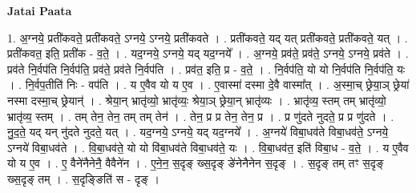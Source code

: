 \documentclass[17pt]{extarticle}
\begin{document}
\textbf{Jatai Paata} \newline

1. अ॒ग्नये॒ प्रती॑कवते॒ प्रती॑कवते॒ ऽग्नये॒ ऽग्नये॒ प्रती॑कवते । . प्रती॑कवते॒ यद् यत् प्रती॑कवते॒ प्रती॑कवते॒ यत् । . प्रती॑कवत॒ इति॒ प्रती॑क - व॒ते॒ । . यद॒ग्नये॒ ऽग्नये॒ यद् यद॒ग्नये᳚ । . अ॒ग्नये॒ प्रव॑ते॒ प्रव॑ते॒ ऽग्नये॒ ऽग्नये॒ प्रव॑ते । . प्रव॑ते नि॒र्वप॑ति नि॒र्वप॑ति॒ प्रव॑ते॒ प्रव॑ते नि॒र्वप॑ति । . प्रव॑त॒ इति॒ प्र - व॒ते॒ । . नि॒र्वप॑ति॒ यो यो नि॒र्वप॑ति नि॒र्वप॑ति॒ यः । . नि॒र्वप॒तीति॑ निः - वप॑ति । . य ए॒वैव यो य ए॒व । . ए॒वास्मा॑ दस्मा दे॒वै वास्मा᳚त् । . अ॒स्मा॒च् छ्रेया॒ञ् छ्रेया॑ नस्मा दस्मा॒च् छ्रेयान्॑ । . श्रेया॒न् भ्रातृ॑व्यो॒ भ्रातृ॑व्यः॒ श्रेया॒ञ् छ्रेया॒न् भ्रातृ॑व्यः । . भ्रातृ॑व्य॒ स्तम् तम् भ्रातृ॑व्यो॒ भ्रातृ॑व्य॒ स्तम् । . तम् तेन॒ तेन॒ तम् तम् तेन॑ । . तेन॒ प्र प्र तेन॒ तेन॒ प्र । . प्र णु॑दते नुदते॒ प्र प्र णु॑दते । . नु॒द॒ते॒ यद् यन् नु॑दते नुदते॒ यत् । . यद॒ग्नये॒ ऽग्नये॒ यद् यद॒ग्नये᳚ । . अ॒ग्नये॑ विबा॒धव॑ते विबा॒धव॑ते॒ ऽग्नये॒ ऽग्नये॑ विबा॒धव॑ते । . वि॒बा॒धव॑ते॒ यो यो वि॑बा॒धव॑ते विबा॒धव॑ते॒ यः । . वि॒बा॒धव॑त॒ इति॑ विबा॒ध - व॒ते॒ । . य ए॒वैव यो य ए॒व । . ए॒ वैने॑नैनेनै॒ वैवैने॑न । . ए॒ने॒न॒ स॒दृङ् ख्स॒दृङ् ङे॑नेनैनेन स॒दृङ् । . स॒दृङ् तम् तꣳ स॒दृङ् ख्स॒दृङ् तम् । . स॒दृङ्ङिति॑ स - दृङ् । \newline
\end{document}
